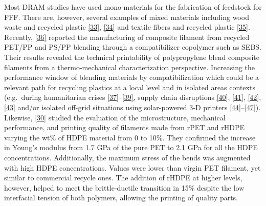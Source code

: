 \documentclass[
]{article}
\begin{document}
Most DRAM studies have used mono-materials for the fabrication of
feedstock for FFF. There are, however, several examples of mixed
materials including wood waste and recycled plastic
\protect\hyperlink{ref-pringle2018}{{[}33{]}},
\protect\hyperlink{ref-loschke2019}{{[}34{]}} and textile fibers and
recycled plastic \protect\hyperlink{ref-carrete2021}{{[}35{]}}.
Recently, \protect\hyperlink{ref-Zander2019}{{[}36{]}} reported the
manufacturing of composite filament from recycled PET/PP and PS/PP
blending through a compatibilizer copolymer such as SEBS. Their results
revealed the technical printability of polypropylene blend composite
filaments from a thermo-mechanical characterization perspective.
Increasing the performance window of blending materials by
compatibilization which could be a relevant path for recycling plastics
at a local level and in isolated areas contexts (e.g.~during
humanitarian crises
\protect\hyperlink{ref-savonen2018}{{[}37{]}}--\protect\hyperlink{ref-lipsky2019}{{[}39{]}},
supply chain disruptions \protect\hyperlink{ref-novak2020}{{[}40{]}},
\protect\hyperlink{ref-choong2020}{{[}41{]}},
\protect\hyperlink{ref-salmi2020}{{[}42{]}},
\protect\hyperlink{ref-attaran2020}{{[}43{]}} and/or isolated off-grid
situations using solar-powered 3-D printers
\protect\hyperlink{ref-king2014}{{[}44{]}}--\protect\hyperlink{ref-Mohammed2018}{{[}47{]}}).
Likewise, \protect\hyperlink{ref-vaucher2022}{{[}30{]}} studied the
evaluation of the microstructure, mechanical performance, and printing
quality of filaments made from rPET and rHDPE varying the wt\% of HDPE
material from 0 to 10\%. They confirmed the increase in Young's modulus
from 1.7 GPa of the pure PET to 2.1 GPa for all the HDPE concentrations.
Additionally, the maximum stress of the bends was augmented with high
HDPE concentrations. Values were lower than virgin PET filament, yet
similar to commercial recycle ones. The addition of rHDPE at higher
levels, however, helped to meet the brittle-ductile transition in 15\%
despite the low interfacial tension of both polymers, allowing the
printing of quality parts.
\end{document}
